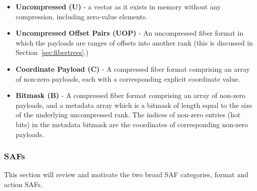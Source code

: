 \begin{itemize}
    \item \textbf{Uncompressed (U)} - a vector as it exists in memory without any compression, including zero-value elements.
    \item \textbf{Uncompressed Offset Pairs (UOP)} - An uncompressed fiber format in which the payloads are ranges of offsets into another rank (this is discussed in Section~\ref{sec:fibertrees}.)
    \item \textbf{Coordinate Payload (C)} - A compressed fiber format comprising an array of non-zero payloads, each with a corresponding explicit coordinate value.
    \item \textbf{Bitmask (B)} - A compressed fiber format comprising an array of non-zero payloads, and a metadata array which is a bitmask of length equal to the size of the underlying uncompressed rank. The indices of non-zero entries (hot bits) in the metadata bitmask are the coordinates of corresponding non-zero payloads.
\end{itemize}

%
%
\subsubsection{SAFs}
\label{background:safs}

This section will review and motivate the two broad SAF categories, format and action SAFs.

